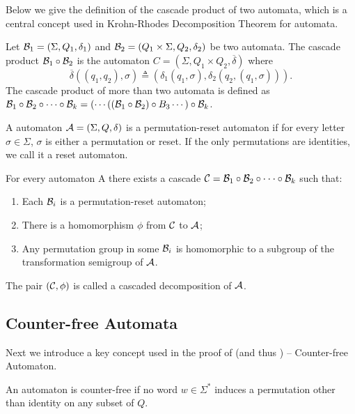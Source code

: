 Below we give the definition of the cascade product of two automata, which is a central concept used in Krohn-Rhodes Decomposition Theorem for automata.

\begin{definition}
Let ${\mathcal{B}}_1 = (\Sigma, Q_1, \delta_1)$ and 
${\mathcal{B}}_2 = (Q_1 \times \Sigma, Q_2, \delta_2)$ be two automata. The cascade product ${\mathcal{B}}_1 \circ {\mathcal{B}}_2$ is the automaton $C = (\Sigma, Q_1\times Q_2, \overline\delta)$ where
$$\overline\delta((q_1, q_2), \sigma) \triangleq (\delta_1(q_1, \sigma), \delta_2(q_2,(q_1, \sigma))).$$
The cascade product of more than two automata is defined as
${\mathcal{B}}_1 \circ {\mathcal{B}}_2 \circ \cdots\circ {\mathcal{B}}_k = (\cdots(({\mathcal{B}}_1 \circ {\mathcal{B}}_2) \circ B_3\cdots) \circ {\mathcal{B}}_k$.
\end{definition}

\begin{definition}
A automaton ${\mathcal{A}} =(\Sigma, Q, \delta)$ is a permutation-reset automaton if for every letter $\sigma \in \Sigma$, $\sigma$ is either a
permutation or reset. If the only
permutations are identities, we call it a reset automaton.
\end{definition}
\begin{theorem}\label{thm:krohn_rhodes}
	For every automaton A there exists a cascade ${\mathcal{C}} = {\mathcal{B}}_1 \circ {\mathcal{B}}_2 \circ \cdot \cdot \cdot \circ {\mathcal{B}}_k$ such that:
	\begin{enumerate}
		\item Each ${\mathcal{B}}_i$ is a permutation-reset automaton;
		\item There is a homomorphism $\phi$ from ${\mathcal{C}}$ to ${\mathcal{A}}$;
		\item Any permutation group in some ${\mathcal{B}}_i$
is homomorphic to a subgroup of the transformation semigroup of ${\mathcal{A}}$.

	\end{enumerate}
The pair $({\mathcal{C}}, \phi)$ is called a cascaded decomposition of ${\mathcal{A}}$.
\end{theorem}

 
\subsection{Counter-free Automata}\label{appsec:counter_free_automata}

Next we introduce a key concept used in the proof of  (and thus ) -- Counter-free Automaton.
\begin{definition}
	An automaton is counter-free if no word $w\in\Sigma^*$ induces a permutation other than identity on any subset of $Q$. 
\end{definition}

